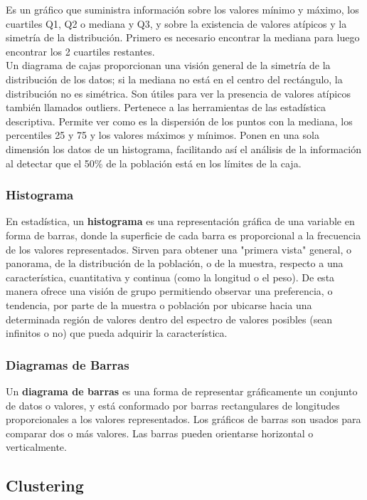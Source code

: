 \documentclass[osajnl,twocolumn,showpacs,superscriptaddress,10pt]{revtex4-1} %
\begin{document}
Es un gráfico que suministra información sobre los valores mínimo y máximo, los cuartiles Q1, Q2 o mediana y Q3, y sobre la existencia de valores atípicos y la simetría de la distribución. Primero es necesario encontrar la mediana para luego encontrar los 2 cuartiles restantes. \\

Un diagrama de cajas proporcionan una visión general de la simetría de la distribución de los datos; si la mediana no está en el centro del rectángulo, la distribución no es simétrica. Son útiles para ver la presencia de valores atípicos también llamados outliers. Pertenece a las herramientas de las estadística descriptiva. Permite ver como es la dispersión de los puntos con la mediana, los percentiles 25 y 75 y los valores máximos y mínimos. Ponen en una sola dimensión los datos de un histograma, facilitando así el análisis de la información al detectar que el 50\% de la población está en los límites de la caja.

\subsubsection{Histograma}

En estadística, un \textbf{histograma} es una representación gráfica de una variable en forma de barras, donde la superficie de cada barra es proporcional a la frecuencia de los valores representados. Sirven para obtener una "primera vista" general, o panorama, de la distribución de la población, o de la muestra, respecto a una característica, cuantitativa y continua (como la longitud o el peso). De esta manera ofrece una visión de grupo permitiendo observar una preferencia, o tendencia, por parte de la muestra o población por ubicarse hacia una determinada región de valores dentro del espectro de valores posibles (sean infinitos o no) que pueda adquirir la característica.

\subsubsection{Diagramas de Barras}

Un \textbf{diagrama de barras} es una forma de representar gráficamente un conjunto de datos o valores, y está conformado por barras rectangulares de longitudes proporcionales a los valores representados. Los gráficos de barras son usados para comparar dos o más valores. Las barras pueden orientarse horizontal o verticalmente.

\subsection{Clustering}
\end{document}
